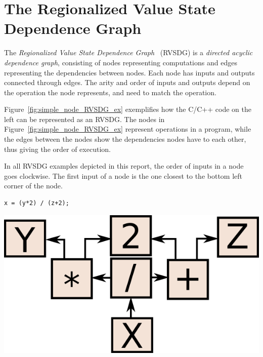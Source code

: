 
\clearpage
\section{The Regionalized Value State Dependence Graph}
\label{background:RVSDG}

The \textit{Regionalized Value State Dependence Graph}~\cite{RVSDG:HiPEACpaper}
(RVSDG) is a \textit{directed acyclic  dependence graph},
consisting of nodes representing computations and edges representing the
dependencies between nodes. Each node has inputs and outputs connected through
edges. The arity and order of inputs and outputs depend on the operation the
node represents, and need to match the operation.

Figure~\ref{fig:simple_node_RVSDG_ex} exemplifies how the C/C++ code on the left
can be represented as an RVSDG. The nodes in
Figure~\ref{fig:simple_node_RVSDG_ex} represent operations in a program, while
the edges between the nodes show the dependencies nodes have to each other, thus
giving the order of execution.

In all RVSDG examples depicted in this report, the order of inputs in a node
goes clockwise. The first input of a node is the one closest to the bottom left
corner of the node.

\begin{centering}
	\noindent\begin{minipage}{0.36\textwidth}
		\begin{CenteredBox}
		\begin{lstlisting}[label={lst:simple_node_RVSDG_ex},
style=minipage_customcpp, basicstyle=\fontsize{10}{1}]
x = (y*2) / (z+2);
		\end{lstlisting}
		\end{CenteredBox}
	\end{minipage}
	\noindent\begin{minipage}{0.55\textwidth}
		\captionsetup{type=figure}
		\includegraphics[width=\textwidth]{figures/svg/simple_node_RVSDG_ex}
	\end{minipage}
	\label{fig:simple_node_RVSDG_ex}
\end{centering}

